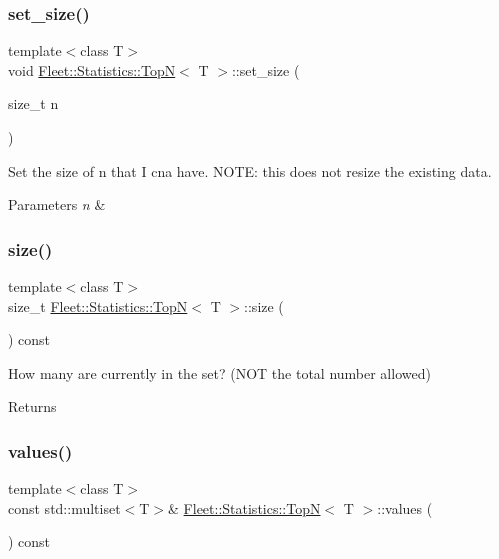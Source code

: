 \subsubsection{\texorpdfstring{set\+\_\+size()}{set\_size()}}
{\footnotesize\ttfamily template$<$class T$>$ \\
void \hyperlink{class_fleet_1_1_statistics_1_1_top_n}{Fleet\+::\+Statistics\+::\+TopN}$<$ T $>$\+::set\+\_\+size (\begin{DoxyParamCaption}\item[{size\+\_\+t}]{n }\end{DoxyParamCaption})\hspace{0.3cm}{\ttfamily [inline]}}

Set the size of n that I cna have. N\+O\+TE\+: this does not resize the existing data. 
\begin{DoxyParams}{Parameters}
{\em n} & \\
\hline
\end{DoxyParams}
\mbox{\label{class_fleet_1_1_statistics_1_1_top_n_a0ce96f95fbac59ba2a858b66b5a6690a}} 
\subsubsection{\texorpdfstring{size()}{size()}}
{\footnotesize\ttfamily template$<$class T$>$ \\
size\+\_\+t \hyperlink{class_fleet_1_1_statistics_1_1_top_n}{Fleet\+::\+Statistics\+::\+TopN}$<$ T $>$\+::size (\begin{DoxyParamCaption}{ }\end{DoxyParamCaption}) const\hspace{0.3cm}{\ttfamily [inline]}}

How many are currently in the set? (N\+OT the total number allowed) \begin{DoxyReturn}{Returns}

\end{DoxyReturn}
\mbox{\label{class_fleet_1_1_statistics_1_1_top_n_ab7ab88abe1dd8afe6ffecf9206cbceb7}} 
\subsubsection{\texorpdfstring{values()}{values()}}
{\footnotesize\ttfamily template$<$class T$>$ \\
const std\+::multiset$<$T$>$\& \hyperlink{class_fleet_1_1_statistics_1_1_top_n}{Fleet\+::\+Statistics\+::\+TopN}$<$ T $>$\+::values (\begin{DoxyParamCaption}{ }\end{DoxyParamCaption}) const\hspace{0.3cm}{\ttfamily [inline]}}

